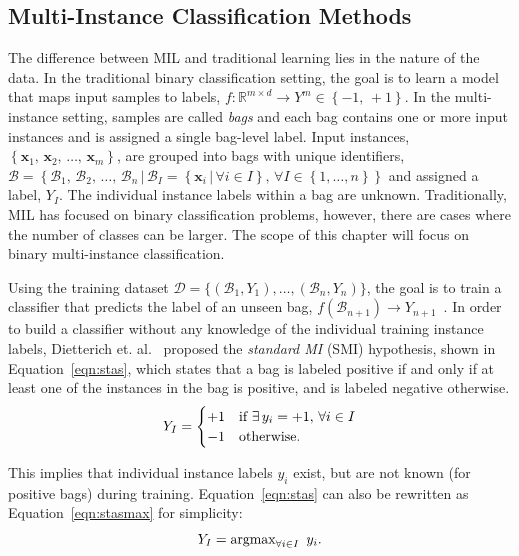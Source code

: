 \documentclass[reqno]{vcuthesis}
\newcommand{\set}[1]{{\left\{#1\right\}}}
\renewcommand{\st}{{\,|\,}}
\newcommand{\reals}{{\mathbb{R}}}
\numberwithin{equation}{chapter}
\begin{document}
\subsection{Multi-Instance Classification Methods}
The difference between MIL and traditional learning lies in the nature of the data. In the traditional binary classification setting, the goal is to learn a model that maps input samples to labels, $f: \reals^{m \times d} \rightarrow Y^m \in \set{-1,\,+1}$. In the multi-instance setting, samples are called \textit{bags} and each bag contains one or more input instances and is assigned a single bag-level label. Input instances, $\set{\bm x_1,\, \bm x_2,\, \ldots,\, \bm x_m}$, are grouped into bags with unique identifiers, $\mathcal{B} = \set{\mathcal{B}_1,\, \mathcal{B}_2,\, \ldots,\, \mathcal{B}_n \st \mathcal{B}_I = \set{\bm x_i \st \forall i \in I},\, \forall I \in \set{1, \ldots, n}}$ and assigned a label, $Y_I$. The individual instance labels within a bag are unknown. Traditionally, MIL has focused on binary classification problems, however, there are cases where the number of classes can be larger. The scope of this chapter will focus on binary multi-instance classification. 

Using the training dataset $\mathcal{D} = \{(\mathcal{B}_1,Y_1), \ldots, (\mathcal{B}_n,Y_n)\}$, the goal is to train a classifier that predicts the label of an unseen bag, $f(\mathcal{B}_{n+1}) \rightarrow Y_{n+1}$~\cite{Amores2013}. In order to build a classifier without any knowledge of the individual training instance labels, Dietterich et. al.~\cite{Dietterich1997} proposed the \textit{standard MI} (SMI) hypothesis, shown in Equation~\eqref{eqn:stas}, which states that a bag is labeled positive if and only if at least one of the instances in the bag is positive, and is labeled negative otherwise.
\begin{equation}
\centering \label{eqn:stas}
 Y_I = \begin{cases}
			+1 & \text{if }\exists\, y_i = +1,\, \forall i \in I \\
			-1 & \text{otherwise}.
		  \end{cases}
\end{equation}

This implies that individual instance labels $y_i$ exist, but are not known (for positive bags) during training. Equation~\eqref{eqn:stas} can also be rewritten as Equation~\eqref{eqn:stasmax} for simplicity:
\begin{equation}
\centering \label{eqn:stasmax}
Y_I = \text{argmax}_{\forall i \in I}\,\,\, y_i.
\end{equation}
\end{document}
